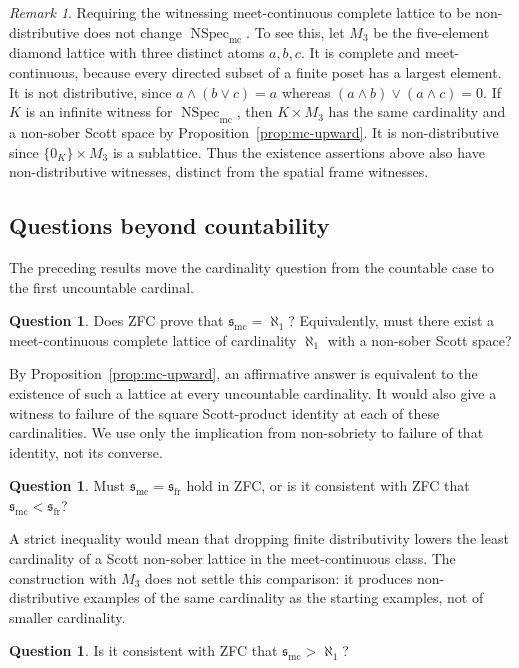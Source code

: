 \documentclass[preprint,11pt]{elsarticle}
\theoremstyle{definition}
\newtheorem{question}[theorem]{Question}
\theoremstyle{remark}
\newtheorem*{remark}{Remark}
\numberwithin{equation}{section}
\newcommand{\mc}{\wedge}
\newcommand{\jc}{\vee}
\newcommand{\Specmc}{\operatorname{NSpec}_{\mathrm{mc}}}
\newcommand{\smc}{\mathfrak{s}_{\mathrm{mc}}}
\newcommand{\sfr}{\mathfrak{s}_{\mathrm{fr}}}
\begin{document}
\begin{remark}
Requiring the witnessing meet-continuous complete lattice to be non-distributive does not change $\Specmc$. To see this, let $M_3$ be the five-element diamond lattice with three distinct atoms $a,b,c$. It is complete and meet-continuous, because every directed subset of a finite poset has a largest element. It is not distributive, since $a\mc(b\jc c)=a$ whereas $(a\mc b)\jc(a\mc c)=0$. If $K$ is an infinite witness for $\Specmc$, then $K\times M_3$ has the same cardinality and a non-sober Scott space by Proposition~\ref{prop:mc-upward}. It is non-distributive since $\{0_K\}\times M_3$ is a sublattice. Thus the existence assertions above also have non-distributive witnesses, distinct from the spatial frame witnesses.
\end{remark}

\subsection{Questions beyond countability}
The preceding results move the cardinality question from the countable case to the first uncountable cardinal.

\begin{question}\label{ques:mc-aleph-one}
Does ZFC prove that $\smc=\aleph_1$? Equivalently, must there exist a meet-continuous complete lattice of cardinality $\aleph_1$ with a non-sober Scott space?
\end{question}

By Proposition~\ref{prop:mc-upward}, an affirmative answer is equivalent to the existence of such a lattice at every uncountable cardinality. It would also give a witness to failure of the square Scott-product identity at each of these cardinalities. We use only the implication from non-sobriety to failure of that identity, not its converse.

\begin{question}\label{ques:mc-frame-threshold}
Must $\smc=\sfr$ hold in ZFC, or is it consistent with ZFC that $\smc<\sfr$?
\end{question}

A strict inequality would mean that dropping finite distributivity lowers the least cardinality of a Scott non-sober lattice in the meet-continuous class. The construction with $M_3$ does not settle this comparison: it produces non-distributive examples of the same cardinality as the starting examples, not of smaller cardinality.

\begin{question}\label{ques:mc-consistency}
Is it consistent with ZFC that $\smc>\aleph_1$?
\end{question}
\end{document}
